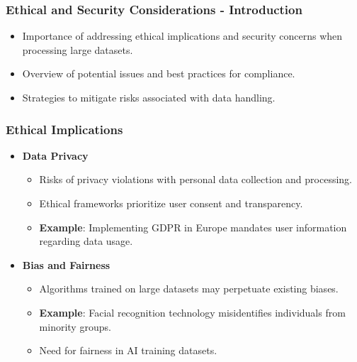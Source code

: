 \documentclass[aspectratio=169]{beamer}
\begin{document}
\begin{frame}[fragile]
    \frametitle{Ethical and Security Considerations - Introduction}
    \begin{itemize}
        \item Importance of addressing ethical implications and security concerns when processing large datasets.
        \item Overview of potential issues and best practices for compliance.
        \item Strategies to mitigate risks associated with data handling.
    \end{itemize}
\end{frame}

\begin{frame}[fragile]
    \frametitle{Ethical Implications}
    \begin{itemize}
        \item \textbf{Data Privacy}
        \begin{itemize}
            \item Risks of privacy violations with personal data collection and processing.
            \item Ethical frameworks prioritize user consent and transparency.
            \item \textbf{Example}: Implementing GDPR in Europe mandates user information regarding data usage.
        \end{itemize}
        
        \item \textbf{Bias and Fairness}
        \begin{itemize}
            \item Algorithms trained on large datasets may perpetuate existing biases.
            \item \textbf{Example}: Facial recognition technology misidentifies individuals from minority groups.
            \item Need for fairness in AI training datasets.
        \end{itemize}
    \end{itemize}
\end{frame}
\end{document}
